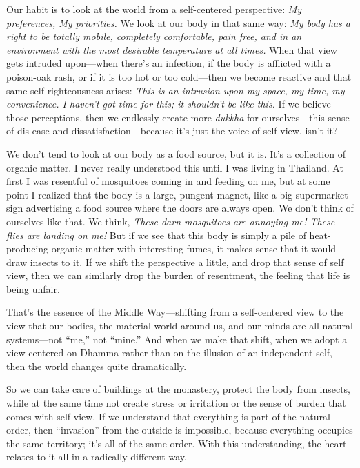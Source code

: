 Our habit is to look at the world from a self-centered perspective: 
\emph{My preferences, My priorities.} We look at our body in that same 
way: \emph{My body has a right to be totally mobile, completely 
comfortable, pain free, and in an environment with the most desirable 
temperature at all times.} When that view gets intruded upon---when 
there's an infection, if the body is afflicted with a poison-oak rash, 
or if it is too hot or too cold---then we become reactive and that same 
self-righteousness arises: \emph{This is an intrusion upon my space, my 
time, my convenience. I haven't got time for this; it shouldn't be like 
this.} If we believe those perceptions, then we endlessly create more 
\emph{dukkha} for ourselves---this sense of dis-ease and 
dissatisfaction---because it's just the voice of self view, isn't it?

We don't tend to look at our body as a food source, but it is. It's a 
collection of organic matter. I never really understood this until I 
was living in Thailand. At first I was resentful of mosquitoes coming 
in and feeding on me, but at some point I realized that the body is a 
large, pungent magnet, like a big supermarket sign advertising a food 
source where the doors are always open. We don't think of ourselves 
like that. We think, \emph{These darn mosquitoes are annoying me! These 
flies are landing on me!} But if we see that this body is simply a pile 
of heat-producing organic matter with interesting fumes, it makes sense 
that it would draw insects to it. If we shift the perspective a little, 
and drop that sense of self view, then we can similarly drop the burden 
of resentment, the feeling that life is being unfair.

That's the essence of the Middle Way---shifting from a self-centered 
view to the view that our bodies, the material world around us, and our 
minds are all natural systems---not ``me,'' not ``mine.'' And when we 
make that shift, when we adopt a view centered on Dhamma rather than on 
the illusion of an independent self, then the world changes quite 
dramatically.

So we can take care of buildings at the monastery, protect the body 
from insects, while at the same time not create stress or irritation or 
the sense of burden that comes with self view. If we understand that 
everything is part of the natural order, then ``invasion'' from the 
outside is impossible, because everything occupies the same territory; 
it's all of the same order. With this understanding, the heart relates 
to it all in a radically different way.

